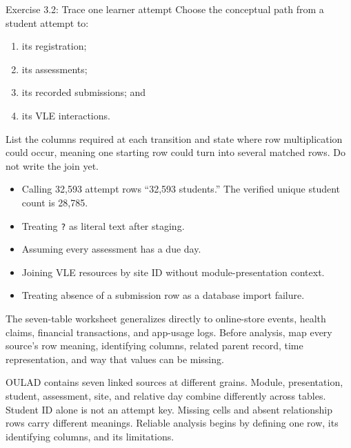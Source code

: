 \begin{exercisebox}{Exercise 3.2: Trace one learner attempt}
Choose the conceptual path from a student attempt to:
\begin{enumerate}
  \item its registration;
  \item its assessments;
  \item its recorded submissions; and
  \item its VLE interactions.
\end{enumerate}
List the columns required at each transition and state where row multiplication
could occur, meaning one starting row could turn into several matched rows. Do
not write the join yet.
\end{exercisebox}

\begin{commonmistakes}
\begin{itemize}
  \item Calling 32,593 attempt rows ``32,593 students.'' The verified unique
    student count is 28,785.
  \item Treating \texttt{?} as literal text after staging.
  \item Assuming every assessment has a due day.
  \item Joining VLE resources by site ID without module-presentation context.
  \item Treating absence of a submission row as a database import failure.
\end{itemize}
\end{commonmistakes}

\transferheading
The seven-table worksheet generalizes directly to online-store events, health
claims, financial transactions, and app-usage logs. Before analysis, map every
source's row meaning, identifying columns, related parent record, time
representation, and way that values can be missing.

\begin{summarybox}
OULAD contains seven linked sources at different grains. Module, presentation,
student, assessment, site, and relative day combine differently across tables.
Student ID alone is not an attempt key. Missing cells and absent relationship
rows carry different meanings. Reliable analysis begins by defining one row,
its identifying columns, and its limitations.
\end{summarybox}
